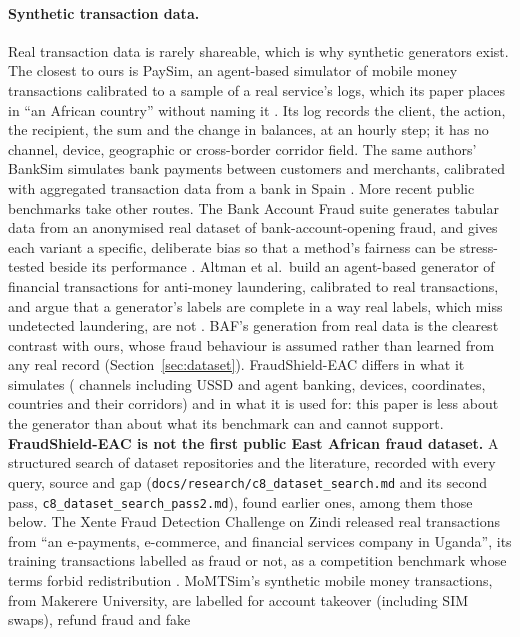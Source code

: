 \paragraph{Synthetic transaction data.} Real transaction data is rarely shareable, which is why
synthetic generators exist. The closest to ours is PaySim, an agent-based simulator of mobile
money transactions calibrated to a sample of a real service's logs, which its paper places in ``an
African country'' without naming it \cite{lopezrojas2016paysim}. Its
log records the client, the action, the recipient, the sum and the change in balances, at an hourly
step; it has no channel, device, geographic or cross-border corridor field. The same authors'
BankSim simulates bank payments between customers and merchants, calibrated with aggregated
transaction data from a bank in Spain \cite{lopezrojas2014banksim}. More recent public benchmarks
take other routes. The Bank Account Fraud suite generates tabular data from an anonymised real
dataset of bank-account-opening fraud, and gives each variant a specific, deliberate bias so that a
method's fairness can be stress-tested beside its performance \cite{jesus2022baf}. Altman et al.\
build an agent-based generator of financial transactions for anti-money laundering, calibrated to
real transactions, and argue that a generator's labels are complete in a way real labels, which miss
undetected laundering, are not \cite{altman2023aml}. BAF's generation from real data is the clearest
contrast with ours, whose fraud behaviour is assumed rather than learned from any real record
(Section~\ref{sec:dataset}). FraudShield-EAC differs in what it
simulates (\nChannels{} channels including USSD and agent banking, devices, coordinates, \nCountries{}
countries and their corridors) and in what it is used for: this paper is less about the generator than about
what its benchmark can and cannot support. \textbf{FraudShield-EAC is not the first public East African fraud dataset.} A structured search of
dataset repositories and the literature, recorded with every query, source and gap
(\texttt{docs/research/c8\_dataset\_search.md} and its second pass,
\texttt{c8\_dataset\_search\_pass2.md}), found earlier ones, among them those below. The Xente Fraud Detection
Challenge on Zindi released real transactions from ``an e-payments, e-commerce, and financial
services company in Uganda'', its training transactions labelled as fraud or not, as a competition
benchmark whose terms
forbid redistribution \cite{zindi2019xente}. MoMTSim's synthetic mobile money transactions, from
Makerere University, are labelled for account takeover (including SIM swaps), refund fraud and fake
